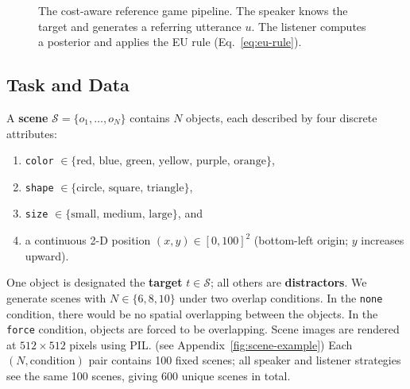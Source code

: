 \begin{figure}[H]
\caption{The cost-aware reference game pipeline.  The speaker knows the target
and generates a referring utterance $u$.  The listener computes a posterior
and applies the EU rule (Eq.~\ref{eq:eu-rule}).}
\label{fig:pipeline}
\end{figure}

\subsection{Task and Data}

A \textbf{scene} $\mathcal{S} = \{o_1,\ldots,o_N\}$ contains $N$ objects,
each described by four discrete attributes:
\begin{enumerate}
  \item \texttt{color} $\in\{\text{red, blue, green, yellow, purple, orange}\}$,
  \item \texttt{shape} $\in\{\text{circle, square, triangle}\}$,
  \item \texttt{size} $\in\{\text{small, medium, large}\}$, and
  \item a continuous 2-D position $(x,y)\in[0,100]^2$
        (bottom-left origin; $y$ increases upward).
\end{enumerate}
One object is designated the \textbf{target} $t \in \mathcal{S}$; all others
are \textbf{distractors}.  We generate scenes with $N\in\{6,8,10\}$ under two
overlap conditions.  In the \texttt{none} condition, there would be no spatial overlapping between the objects.
In the \texttt{force} condition, objects are forced to be overlapping. Scene images are rendered at $512\times512$ pixels using PIL.  (see Appendix~\ref{fig:scene-example})
Each $(N,\text{condition})$ pair contains 100 fixed scenes; all speaker and listener strategies see the same 100 scenes, giving 600 unique scenes in total. 

